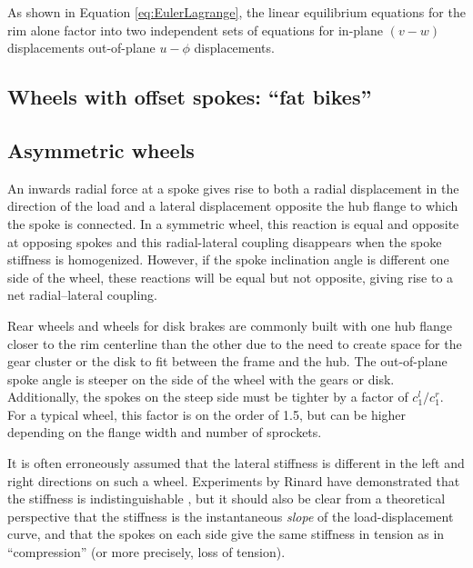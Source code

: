 \documentclass[\rootdir/thesis.tex]{subfiles}
\begin{document}
As shown in Equation \eqref{eq:EulerLagrange}, the linear equilibrium equations for the rim alone factor into two independent sets of equations for in-plane $(v-w)$ displacements out-of-plane $u-\phi$ displacements. 

\subsection{Wheels with offset spokes: ``fat bikes''}



\subsection{Asymmetric wheels}

An inwards radial force at a spoke gives rise to both a radial displacement in the direction of the load and a lateral displacement opposite the hub flange to which the spoke is connected. In a symmetric wheel, this reaction is equal and opposite at opposing spokes and this radial-lateral coupling disappears when the spoke stiffness is homogenized. However, if the spoke inclination angle is different one side of the wheel, these reactions will be equal but not opposite, giving rise to a net radial--lateral coupling.

Rear wheels and wheels for disk brakes are commonly built with one hub flange closer to the rim centerline than the other due to the need to create space for the gear cluster or the disk to fit between the frame and the hub. The out-of-plane spoke angle is steeper on the side of the wheel with the gears or disk. Additionally, the spokes on the steep side must be tighter by a factor of $c_1^l/c_1^r$. For a typical wheel, this factor is on the order of 1.5, but can be higher depending on the flange width and number of sprockets.

It is often erroneously assumed that the lateral stiffness is different in the left and right directions on such a wheel. Experiments by Rinard have demonstrated that the stiffness is indistinguishable \cite{Rinard}, but it should also be clear from a theoretical perspective that the stiffness is the instantaneous \emph{slope} of the load-displacement curve, and that the spokes on each side give the same stiffness in tension as in ``compression'' (or more precisely, loss of tension).
\end{document}
